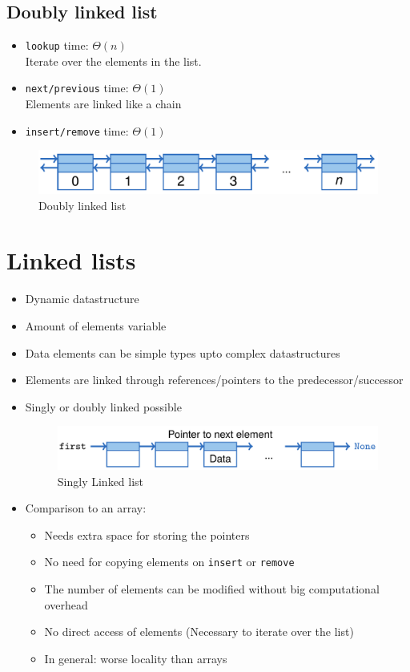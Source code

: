 \documentclass[12pt, a4paper]{scrartcl}
\newcommand{\imgwidth}{.7\textwidth}
\begin{document}
\subsection{Doubly linked list}
\begin{itemize}
\item \texttt{lookup} time: $\Theta(n)$\\
  Iterate over the elements in the list.
\item \texttt{next/previous} time: $\Theta(1)$\\
  Elements are linked like a chain
\item \texttt{insert/remove} time: $\Theta(1)$
\end{itemize}
\begin{figure}[htbp]
  \centering
  \includegraphics[width=\imgwidth]{doubly_linked_list}
  \caption{Doubly linked list}
  \label{fig:doubly_linked_list}
\end{figure}

\section{Linked lists}
\label{sec:linked_lists}
\begin{itemize}
\item Dynamic datastructure
\item Amount of elements variable
\item Data elements can be simple types upto complex datastructures
\item Elements are linked through references/pointers to the predecessor/successor
\item Singly or doubly linked possible
  \begin{figure}[htbp]
    \centering
    \includegraphics[width=\imgwidth]{singly_linked_list}
    \caption{Singly Linked list}
    \label{fig:singly_linked_list}
  \end{figure}
\item Comparison to an array:
  \begin{itemize}
  \item Needs extra space for storing the pointers
  \item No need for copying elements on \texttt{insert} or \texttt{remove}
  \item The number of elements can be modified without big computational overhead
  \item No direct access of elements (Necessary to iterate over the list)
  \item In general: worse locality than arrays
  \end{itemize}
\end{itemize}
\end{document}
